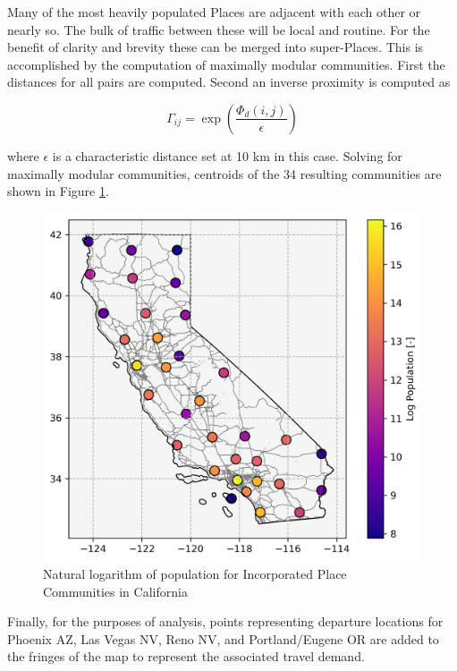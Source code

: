 Many of the most heavily populated Places are adjacent with each other or nearly so. The bulk of traffic between these will be local and routine. For the benefit of clarity and brevity these can be merged into super-Places. This is accomplished by the computation of maximally modular communities. First the distances for all pairs are computed. Second an inverse proximity is computed as

\begin{equation}
	\Gamma_{ij} = \exp{\left(\frac{\Phi_d(i,j)}{\epsilon}\right)}
\end{equation}

where $\epsilon$ is a characteristic distance set at 10 km in this case. Solving for maximally modular communities, centroids of the 34 resulting communities are shown in Figure \ref{fig:california_incorporated_communities}.

\begin{figure}[H]
	\centering
	\includegraphics[width = \linewidth]{figs/california_incorporated_communities.png}
	\caption{Natural logarithm  of population for Incorporated Place Communities in California}
	\label{fig:california_incorporated_communities}
\end{figure}

Finally, for the purposes of analysis, points representing departure locations for Phoenix AZ, Las Vegas NV, Reno NV, and Portland/Eugene OR are added to the fringes of the map to represent the associated travel demand.

